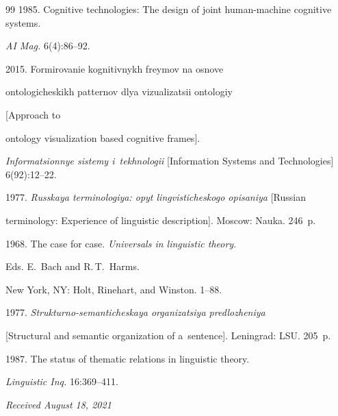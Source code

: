 {{\begin{thebibliography}{99}
 1985. Cognitive technologies: The design of joint human-machine cognitive systems. 

\textit{AI Mag.} 6(4):86--92.


 2015. Formirovanie kog\-ni\-tiv\-nykh frey\-mov na osno\-ve 

on\-to\-lo\-gi\-che\-skikh pat\-ter\-nov dlya vi\-zu\-a\-li\-za\-tsii on\-to\-lo\-giy 

[Approach to

ontology visualization based cognitive frames]. 

\textit{Informatsionnye sistemy i~tekhnologii} [Information  Systems and Technologies] 6(92):12--22.


 1977. \textit{Russkaya terminologiya: opyt lingvisticheskogo opisaniya} [Russian 

terminology: Experience of linguistic description]. Moscow: Nauka. 246~p.


 1968. The case for case. \textit{Universals in linguistic theory}. 

Eds. E.~Bach and R.\,T.~Harms. 

New York, NY: Holt, Rinehart, and Winston. 1--88. 


 1977. \textit{Strukturno-semanticheskaya or\-ga\-ni\-za\-tsiya pred\-lo\-zhe\-niya} 

[Structural and semantic organization of a~sentence]. Leningrad: LSU. 205~p.


 1987. The status of thematic relations in linguistic theory. 

\textit{Linguistic Inq.} 16:369--411.



\end{thebibliography}

} }



\vspace*{-6pt}



\hfill{\small\textit{Received August 18, 2021}} 




